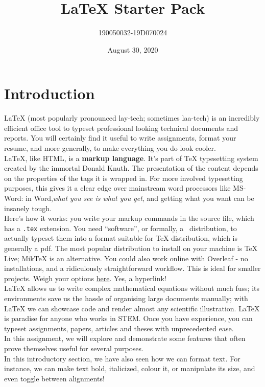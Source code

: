 \documentclass[10pt, A4]{article}
\newcounter{code}[section]
\begin{document}
	\title{\LaTeX{} Starter Pack}
	\author{190050032-19D070024}
	\date{August 30, 2020}
	\maketitle
	\tableofcontents
	\thispagestyle{empty}
	\newpage
	\section{Introduction}
	\label{sec:Intro}
	\LaTeX{} (most popularly pronounced lay-tech; sometimes laa-tech) is an incredibly efficient office
	tool to typeset professional looking technical documents and reports. You will certainly find it
	useful to write assignments, format your resume, and more generally, to make everything you do
	look cooler.\vspace{0.5em}\\
	\LaTeX{}, like HTML, is a \textbf{markup language}. It’s part of \TeX{} typesetting system created by
	the immortal Donald Knuth. The presentation of the content depends on the properties of the
	tags it is wrapped in. For more involved typesetting purposes, this gives it a clear edge over
	mainstream word processors like {\color{blue}MS-Word}: in Word,\textit{what you see is what you get}, and getting
	what you want can be insanely tough.
	\vspace{0.5em}\\
	Here's how it works: you write your markup commands in the source file, which has a \texttt{.tex}
	extension. You need “software”, or formally, a \ distribution, to actually typeset them into a
	format suitable for \TeX{} distribution, which is generally a pdf. The most popular distribution to install
	on your machine is TeX Live; MikTeX is an alternative. You could also work online with Overleaf
	- no installations, and a ridiculously straightforward workflow. This is ideal for smaller projects.
	Weigh your options \href{https://www.latex-project.org/get/}{here}. Yes, a hyperlink!\vspace{0.5em}\\
	\LaTeX{} allows us to write complex mathematical equations without much fuss; its environments
	save us the hassle of organising large documents manually; with \LaTeX{} we can showcase code and
	render almost any scientific illustration. \LaTeX{} is paradise for anyone who works in STEM. Once
	you have experience, you can typeset assignments, papers, articles and theses with unprecedented
	ease.\vspace{0.5em}\\
	{In this assignment, we will explore and demonstrate some features that often prove themselves
		useful for several purposes}.\vspace{0.5em}\\
	{\large In this introductory section, we have also seen how we can format text. For instance,
		we can make text bold, italicized, colour it, or manipulate its size, and even toggle
		between alignments!}\\
		\vspace{2em}
	
\end{document}
